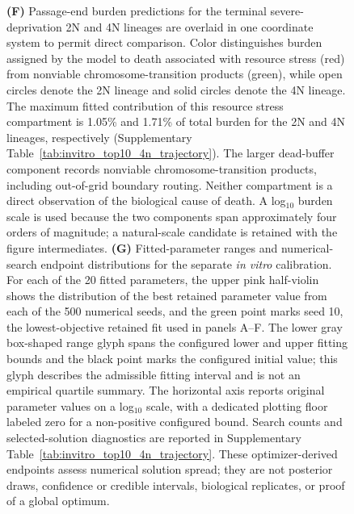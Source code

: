 \documentclass[11pt]{article}
\begin{document}
\begin{figure}[!htbp]
{\textbf{(F)} Passage-end burden predictions for the terminal severe-deprivation 2N and 4N lineages are overlaid in one coordinate system to permit direct comparison. Color distinguishes burden assigned by the model to death associated with resource stress (red) from nonviable chromosome-transition products (green), while open circles denote the 2N lineage and solid circles denote the 4N lineage. The maximum fitted contribution of this resource stress compartment is 1.05\% and 1.71\% of total burden for the 2N and 4N lineages, respectively (Supplementary Table~\ref{tab:invitro_top10_4n_trajectory}). The larger dead-buffer component records nonviable chromosome-transition products, including out-of-grid boundary routing. Neither compartment is a direct observation of the biological cause of death. A log$_{10}$ burden scale is used because the two components span approximately four orders of magnitude; a natural-scale candidate is retained with the figure intermediates.
\textbf{(G)} Fitted-parameter ranges and numerical-search endpoint distributions for the separate \textit{in vitro} calibration. For each of the 20 fitted parameters, the upper pink half-violin shows the distribution of the best retained parameter value from each of the 500 numerical seeds, and the green point marks seed 10, the lowest-objective retained fit used in panels A--F. The lower gray box-shaped range glyph spans the configured lower and upper fitting bounds and the black point marks the configured initial value; this glyph describes the admissible fitting interval and is not an empirical quartile summary. The horizontal axis reports original parameter values on a log$_{10}$ scale, with a dedicated plotting floor labeled zero for a non-positive configured bound. Search counts and selected-solution diagnostics are reported in Supplementary Table~\ref{tab:invitro_top10_4n_trajectory}. These optimizer-derived endpoints assess numerical solution spread; they are not posterior draws, confidence or credible intervals, biological replicates, or proof of a global optimum.}
\label{fig:iteration1-invitro-ploidy-reshaping}
\end{figure}
\end{document}
